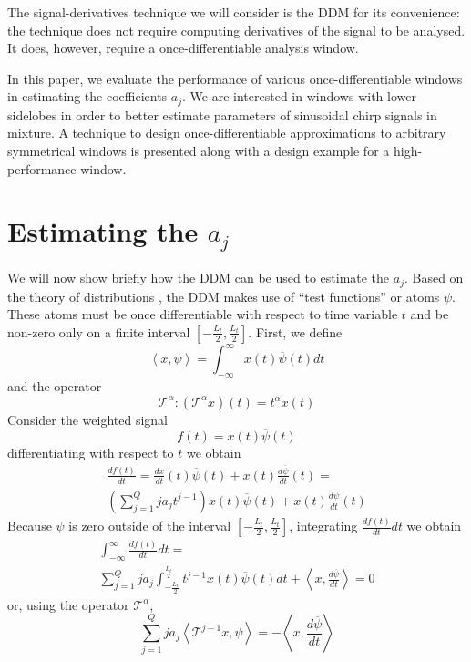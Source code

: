 \documentclass[twoside,a4paper]{article}
\begin{document}
The signal-derivatives technique we will consider is the
DDM for its convenience: the technique does not
require computing derivatives of the signal to be analysed. It does, however, require a
once-differentiable analysis window.

In this paper, we evaluate the performance of various once-differentiable
windows in estimating the coefficients
$a_{j}$. We are interested in windows with lower sidelobes in order to better
estimate parameters of sinusoidal chirp signals in mixture. A technique to
design once-differentiable approximations to arbitrary symmetrical windows is
presented along with a design example for a high-performance window.

\section{Estimating the \lowercase{$a_{j}$}}
We will now show briefly how the DDM can be used to estimate the $a_j$. Based on
the theory of distributions \cite{schwartz1959theorie}, the DDM
makes use of ``test
functions'' or atoms $\psi$. These atoms must be once differentiable with
respect to time variable $t$ and be non-zero only on a finite interval
$[-\frac{L_{t}}{2},\frac{L_{t}}{2}]$. First, we define
%
\begin{equation}
    \label{eq:ddm:inner:prod:def}
    \left\langle x , \psi \right\rangle = 
    \int_{-\infty}^{\infty}x(t)\overline{\psi}(t)dt
\end{equation}
%
and the operator 
%
\[
\mathcal{T}^{\alpha} : (\mathcal{T}^{\alpha}x)(t) = t^{\alpha}x(t)
\]
%
Consider the weighted signal
%
\[
    f(t) = x(t) \overline{\psi}(t)
\]
%
differentiating with respect to $t$ we obtain
%
\begin{multline}
    \label{eq:ddm:weighted:sig:derivative}
    \frac{df(t)}{dt} = 
    \frac{dx}{dt}(t)\overline{\psi}(t)
    + x(t)\frac{d\overline{\psi}}{dt}(t) = \\
    \left( \sum_{j=1}^{Q} j a_j t^{j-1} \right) x(t)\overline{\psi}(t)
    + x(t)\frac{d\overline{\psi}}{dt}(t)
\end{multline}
%
Because $\psi$ is zero outside of the interval $[-\frac{L_{t}}{2},\frac{L_{t}}{2}]$, integrating
$\frac{df(t)}{dt}dt$ we obtain
%
\begin{multline*}
    \int_{-\infty}^{\infty}\frac{df(t)}{dt}dt = \\
    \sum_{j=1}^{Q} j a_j \int_{-\frac{L_{t}}{2}}^{\frac{L_{t}}{2}} t^{j-1} x(t) \overline{\psi}(t) dt
    + \left\langle x, \frac{d\overline{\psi}}{dt} \right\rangle = 0
\end{multline*}
%
or, using the operator $\mathcal{T}^{\alpha}$,
%
\[ 
    \sum_{j=1}^{Q} j a_j 
    \left\langle \mathcal{T}^{j-1} x , \overline{\psi} \right\rangle
    = -\left\langle x, \frac{d\overline{\psi}}{dt} \right\rangle
\]
%
\end{document}
